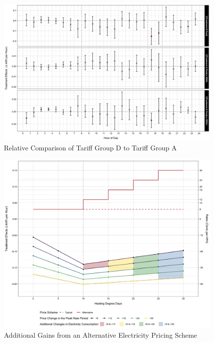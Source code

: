    \begin{figure}[t!]
        \centering
        \includegraphics[scale = 0.1]{03_Chapter-2/00A_Figures/Figure_Time-Profile-of-ATEs_Using-Tariff-Groups-A-and-D_Knot-15.png}
        \caption{Relative Comparison of Tariff Group D to Tariff Group A}
        \label{Figure:Relative-Comparison-of-Tariff-Group-D-to-Tariff-Group-A}
    \end{figure}
\hspace{0.3cm}

    \begin{figure}[t!]
        \centering
        \includegraphics[scale = 0.075]{03_Chapter-2/00A_Figures/Figure_Additional-Electricity-Savings_Knot-10.png}
        \caption{Additional Gains from an Alternative Electricity Pricing Scheme}
        \label{Figure:Additional-Savings-from-an-Alternative-Electricity-Pricing-Scheme}
    \end{figure}

